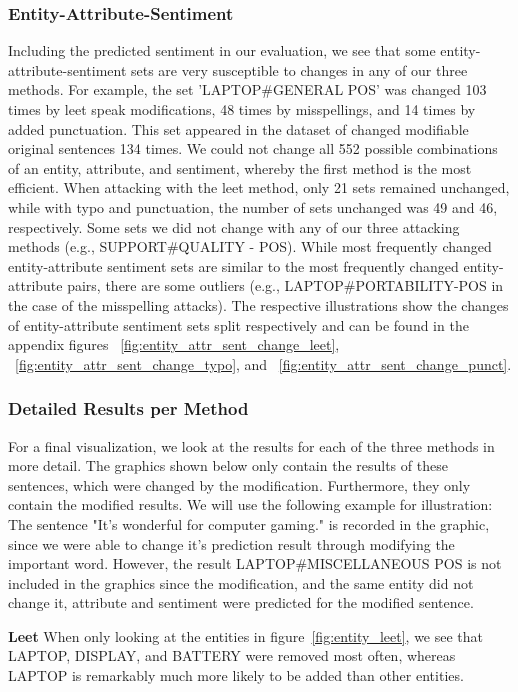 \subsubsection{Entity-Attribute-Sentiment}
Including the predicted sentiment in our evaluation, we see that some entity-attribute-sentiment sets are very susceptible to changes in any of our three methods. For example, the set 'LAPTOP#GENERAL POS' was changed 103 times by leet speak modifications, 48 times by misspellings, and 14 times by added punctuation. This set appeared in the dataset of changed modifiable original sentences 134 times. We could not change all 552 possible combinations of an entity, attribute, and sentiment, whereby the first method is the most efficient. When attacking with the leet method, only 21 sets remained unchanged, while with typo and punctuation, the number of sets unchanged was 49 and 46, respectively. Some sets we did not change with any of our three attacking methods (e.g., SUPPORT#QUALITY - POS). While most frequently changed entity-attribute sentiment sets are similar to the most frequently changed entity-attribute pairs, there are some outliers (e.g., LAPTOP#PORTABILITY-POS in the case of the misspelling attacks). The respective illustrations show the changes of entity-attribute sentiment sets split respectively and can be found in the appendix figures ~\ref{fig:entity_attr_sent_change_leet}, ~\ref{fig:entity_attr_sent_change_typo}, and ~\ref{fig:entity_attr_sent_change_punct}.

\subsubsection{Detailed Results per Method}

For a final visualization, we look at the results for each of the three methods in more detail.
The graphics shown below only contain the results of these sentences, which were changed by the modification. Furthermore, they only contain the modified results. We will use the following example for illustration:
The sentence "It's wonderful for computer gaming." is recorded in the graphic, since we were able to change it's prediction result through modifying the important word. However, the result LAPTOP#MISCELLANEOUS POS is not included in the graphics since the modification, and the same entity did not change it, attribute and sentiment were predicted for the modified sentence.

\textbf{Leet}
When only looking at the entities in figure~\ref{fig:entity_leet}, we see that LAPTOP, DISPLAY, and BATTERY were removed most often, whereas LAPTOP is remarkably much more likely to be added than other entities.

